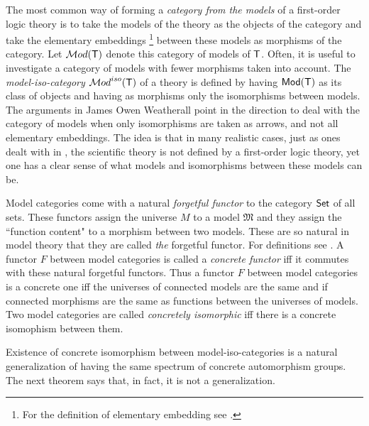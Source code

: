 \documentclass[12pt,leqno]{article}
\newcommand{\Mm}{\mbox{$\mathfrak M$}}
\newcommand{\Aut}{\mbox{\sf Aut}}
\newcommand{\Set}{\mbox{\sf Set}}
\newcommand{\T}{\mbox{\sf T}}
\newcommand{\Mod}{\mbox{\sf Mod}}
\newcommand{\Cat}{\mbox{$\mathcal Mod$}}
\begin{document}
The most common way of forming a \emph{category from the models} of
a first-order logic theory is to take the models of the theory as the
objects of the category and take the elementary embeddings%
\footnote{For the definition of  elementary embedding see \cite[p.84]{CK}.} between
these models as morphisms of the category. Let $\Cat(\T)$ denote
this category of models of $\T$. %
%
Often, it is useful to investigate a category of models with fewer morphisms taken into account. The \emph{model-iso-category} $\Cat^{iso}(\T)$ of a theory is defined by having $\Mod(\T)$ as its class of objects and having as morphisms only the isomorphisms between models.
The arguments in James Owen Weatherall \cite{Weatherall} point in
the direction to deal with the category of models when only
isomorphisms are taken as arrows, and not all elementary embeddings.
The idea is that in many realistic cases, just as ones dealt with in
\cite{Weatherall}, the scientific theory is not defined by a first-order logic theory, yet one has a clear sense of what models and
isomorphisms between these models can be.

Model categories come with a natural \emph{forgetful functor} to the category $\Set$ of all sets. These functors assign the universe $M$ to a model $\Mm$ and they assign the ``function content" to a morphism between two models. These are so natural in model theory that they are called \emph{the} forgetful functor. For definitions see \cite[Definition  5.1 (1)]{AHS}. A functor $F$ between model categories is called a \emph{concrete functor} iff it commutes with these natural forgetful functors. Thus a functor $F$ between model categories is a concrete one iff the universes of connected models are the same and if connected morphisms are the same as functions between the universes of models. Two model categories are called \emph{concretely isomorphic} iff there is a concrete isomophism between them.

Existence of concrete isomorphism between model-iso-categories is a natural generalization of having the same spectrum of concrete automorphism groups. The next theorem says that, in fact, it is not a generalization.
\end{document}

